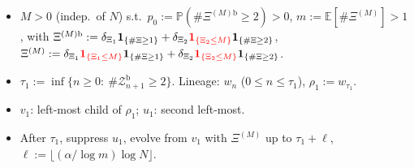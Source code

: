 \centering
\resizebox{0.80\textwidth}{!}{}

\vspace{4pt}
\begin{itemize}
    \item $M>0$ (indep.~of $N$) s.t.\ $p_0:=\mathbb P(\#\Xi^{(M)\mathrm b}\ge 2)>0$,
    $m:=\mathbb E[\#\Xi^{(M)}]>1$, with
    $\Xi^{(M)\mathrm b}:=\delta_{\Xi_1}{\bf 1}_{\{\#\Xi\ge 1\}}+\delta_{\Xi_2}{\color{red}{\bf 1}_{\{\Xi_2\le M\}}}{\bf 1}_{\{\#\Xi\ge 2\}}$,
    $\Xi^{(M)}:=\delta_{\Xi_1}{\color{red}{\bf 1}_{\{\Xi_1\le M\}}}{\bf 1}_{\{\#\Xi\ge 1\}}+\delta_{\Xi_2}{\color{red}{\bf 1}_{\{\Xi_2\le M\}}}{\bf 1}_{\{\#\Xi\ge 2\}}$.
    \item $\tau_1:=\inf\{n\ge 0:\ \#\mathcal Z^{\mathrm b}_{n+1}\ge 2\}$.
    Lineage: $w_n$ ($0\le n\le\tau_1$), $\rho_1:=w_{\tau_1}$.
    \item $v_1$: left-most child of $\rho_1$; $u_1$: second left-most.
    \item After $\tau_1$, suppress $u_1$, evolve from $v_1$ with $\Xi^{(M)}$
    up to $\tau_1+\ell$, $\ell:=\lfloor(\alpha/\log m)\log N\rfloor$.
\end{itemize}
